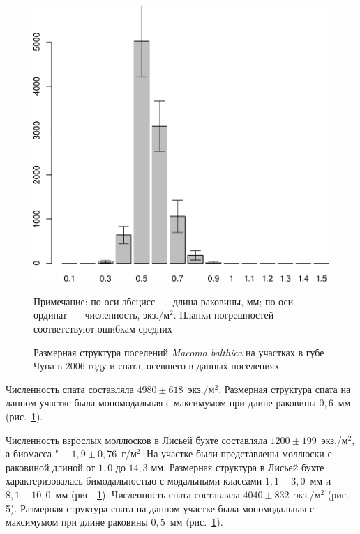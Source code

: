 \begin{figure}[p]
\begin{minipage}[b]{.49\linewidth}
\begin{center}
	\end{center}
	\end{minipage}
%
	\hfil %
%
	\begin{minipage}[b]{.49\linewidth}
	\begin{center}	
		\includegraphics[width=0.215\textheight]{../White_Sea/spat/spat_str_Podpahta_1.pdf}
	\end{center}
	\end{minipage}
		\caption{Размерная структура поселений {\it Macoma balthica} на участках в губе Чупа в 2006 году и спата, осевшего в данных поселениях}
		\label{ris:Chupa_spat_sizestr}
\footnotesize{Примечание: по оси абсцисс~--- длина раковины, мм; по оси ординат~--- численность, экз./м$^2$. Планки погрешностей соответствуют ошибкам средних}
	\end{figure}
Численность спата составляла $4980 \pm 618$~экз./м$^2$. 
Размерная структура спата на данном участке была мономодальная с максимумом при длине раковины $0,6$~мм (рис.~\ref{ris:Chupa_spat_sizestr}).

Численность взрослых моллюсков в Лисьей бухте составляла $1200 \pm 199$~экз./м$^2$, а биомасса "--- $1,9 \pm 0,76$~г/м$^2$. 
На участке были представлены моллюски с раковиной длиной от $1,0$ до $14,3$ мм. 
Размерная структура в Лисьей бухте характеризовалась бимодальностью с модальными классами $1,1 - 3,0$~мм и $8,1 - 10,0$~мм (рис.~\ref{ris:Chupa_spat_sizestr}). 
Численность спата составляла $4040 \pm 832$~экз./м$^2$ (рис. 5). 
Размерная структура спата на данном участке была мономодальная с максимумом при длине раковины $0,5$~мм (рис.~\ref{ris:Chupa_spat_sizestr}).

